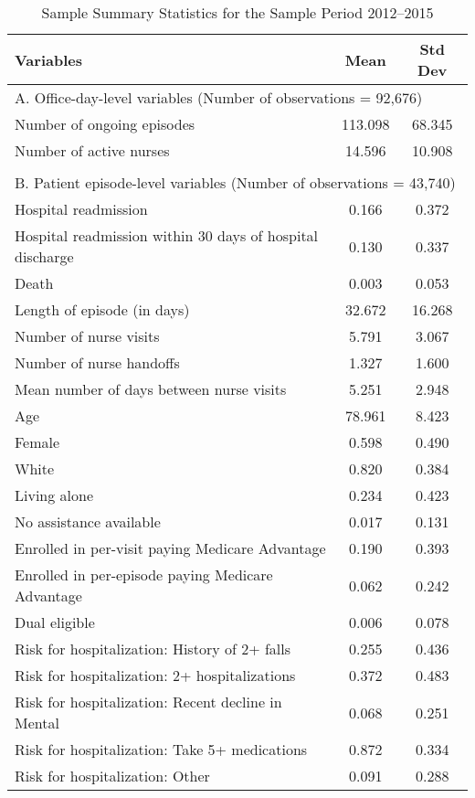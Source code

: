 \documentclass[final,12pt, notitlepage]{article}
\begin{document}
\begin{singlespace}

\newpage
{\footnotesize
\begin{longtable}{lcc}
\caption{Sample Summary Statistics for the Sample Period 2012--2015}
\label{tab:summstats}\\
\toprule
Variables & Mean & Std Dev \\
\midrule
\multicolumn{3}{l}{A. Office-day-level variables (Number of observations = 92,676)} \\
Number of ongoing episodes  &  113.098 & 68.345 \\
Number of active nurses      & 14.596   & 10.908 \\
\\
\multicolumn{3}{l}{B. Patient episode-level variables (Number of observations = 43,740)} \\
Hospital readmission & 0.166 & 0.372 \\
Hospital readmission within 30 days of hospital discharge & 0.130 & 0.337 \\
Death & 0.003 & 0.053 \\
Length of episode (in days) & 32.672 & 16.268 \\
Number of nurse visits & 5.791 & 3.067 \\
Number of nurse handoffs & 1.327 & 1.600 \\
Mean number of days between nurse visits & 5.251 & 2.948 \\
Age & 78.961 & 8.423 \\
Female & 0.598 & 0.490 \\
White & 0.820 & 0.384 \\
Living alone & 0.234 & 0.423 \\
No assistance available & 0.017 & 0.131 \\
Enrolled in per-visit paying Medicare Advantage & 0.190 & 0.393 \\
Enrolled in per-episode paying Medicare Advantage & 0.062 & 0.242 \\
Dual eligible & 0.006 & 0.078 \\
Risk for hospitalization: History of 2+ falls & 0.255 & 0.436 \\
Risk for hospitalization: 2+ hospitalizations & 0.372 & 0.483 \\
Risk for hospitalization: Recent decline in Mental & 0.068 & 0.251 \\
Risk for hospitalization: Take 5+ medications & 0.872 & 0.334 \\
Risk for hospitalization: Other & 0.091 & 0.288 \\

\end{longtable}}
\end{singlespace}
\end{document}
